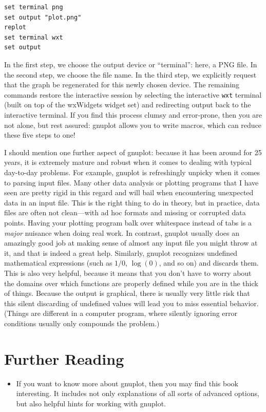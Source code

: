 \begin{verbatim}
set terminal png
set output "plot.png"
replot
set terminal wxt
set output
\end{verbatim}

In the first step, we choose the output device or ``terminal'': here,
a PNG file. In the second step, we choose the file name. In the third
step, we explicitly request that the graph be regenerated for this
newly chosen device. The remaining commands restore the interactive
session by selecting the interactive \texttt{wxt} terminal (built on
top of the wxWidgets widget set) and redirecting output back to the
interactive terminal. If you find this process clumsy and error-prone,
then you are not alone, but rest assured: gnuplot allows you to write
macros, which can reduce these five steps to one!

I should mention one further aspect of gnuplot: because it has been
around for 25 years, it is extremely mature and robust when it comes
to dealing with typical day-to-day problems. For example, gnuplot is
refreshingly unpicky when it comes to parsing input files. Many other
data analysis or plotting programs that I have seen are pretty rigid
in this regard and will bail when encountering unexpected data in an
input file. This is the right thing to do in theory, but in
practice, data files are often not clean---with ad hoc formats and
missing or corrupted data points. Having your plotting program balk
over whitespace instead of tabs is a \emph{major} nuisance when doing
real work. In contrast, gnuplot usually does an amazingly good job at
making sense of almost any input file you might throw at it, and that
is indeed a great help. Similarly, gnuplot recognizes undefined
mathematical expressions (such as $1/0$, $\log(0)$, and so on) and
discards them.  This is also very helpful, because it means that you
don't have to worry about the domains over which functions are
properly defined while you are in the thick of things. Because the
output is graphical, there is usually very little risk that this
silent discarding of undefined values will lead you to miss essential
behavior.  (Things are different in a computer program, where silently
ignoring error conditions usually only compounds the problem.)

\section{Further Reading}

\begin{itemize}

\item {}
  If you want to know more about gnuplot, then you may find this book
  interesting. It includes not only explanations of all sorts of
  advanced options, but also helpful hints for working with gnuplot.

\end{itemize}

